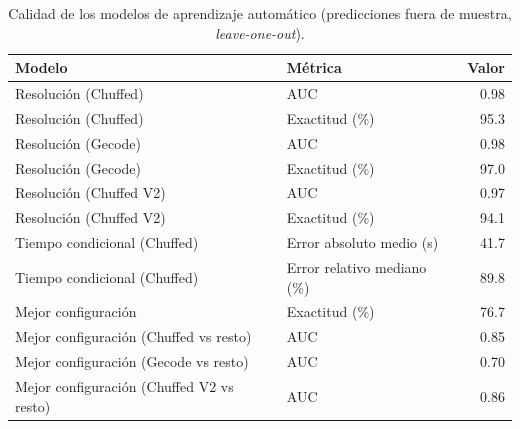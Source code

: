 \begin{table}[H]
  \centering
  \small
  \singlespacing
  \caption{Calidad de los modelos de aprendizaje automático (predicciones fuera de muestra, \textit{leave-one-out}).}
  \label{tab:ml_calidad}
  \begin{tabular}{llr}
    \toprule
    Modelo & Métrica & Valor \\
    \midrule
    Resolución (Chuffed) & AUC & 0.98 \\
    Resolución (Chuffed) & Exactitud (\%) & 95.3 \\
    Resolución (Gecode) & AUC & 0.98 \\
    Resolución (Gecode) & Exactitud (\%) & 97.0 \\
    Resolución (Chuffed V2) & AUC & 0.97 \\
    Resolución (Chuffed V2) & Exactitud (\%) & 94.1 \\
    Tiempo condicional (Chuffed) & Error absoluto medio (s) & 41.7 \\
    Tiempo condicional (Chuffed) & Error relativo mediano (\%) & 89.8 \\
    Mejor configuración & Exactitud (\%) & 76.7 \\
    Mejor configuración (Chuffed vs resto) & AUC & 0.85 \\
    Mejor configuración (Gecode vs resto) & AUC & 0.70 \\
    Mejor configuración (Chuffed V2 vs resto) & AUC & 0.86 \\
    \bottomrule
  \end{tabular}
\end{table}
